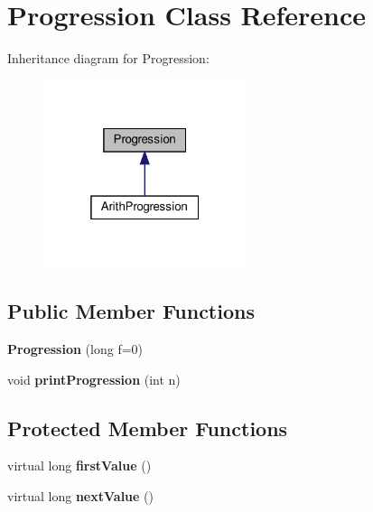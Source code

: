 \hypertarget{classProgression}{}\section{Progression Class Reference}
\label{classProgression}


Inheritance diagram for Progression\+:
\nopagebreak
\begin{figure}[H]
\begin{center}
\leavevmode
\includegraphics[width=169pt]{classProgression__inherit__graph}
\end{center}
\end{figure}
\subsection*{Public Member Functions}
\begin{DoxyCompactItemize}
\item 
\mbox{\label{classProgression_a4d746d05334214c18f8cda8ff6006659}} 
{\bfseries Progression} (long f=0)
\item 
\mbox{\label{classProgression_ad652f1d934da13b088422f675212e1fd}} 
void {\bfseries print\+Progression} (int n)
\end{DoxyCompactItemize}
\subsection*{Protected Member Functions}
\begin{DoxyCompactItemize}
\item 
\mbox{\label{classProgression_aa930e887ec5fc8ba27c358e43d561393}} 
virtual long {\bfseries first\+Value} ()
\item 
\mbox{\label{classProgression_a52e78526540e4e1f1194a2936160e9a4}} 
virtual long {\bfseries next\+Value} ()
\end{DoxyCompactItemize}
